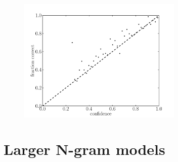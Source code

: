\documentclass[11pt]{article}
\newcommand{\figlabel}[1]{\label{fig:#1}}
\begin{document}
\begin{figure}[htbp]
\begin{center}
    \includegraphics[width=0.7\textwidth]{unigram_confidence_scale.pdf}
\end{center}
\caption{%
\figlabel{unigram-confidence-scale}}
\end{figure}

\section{Larger N-gram models}
\end{document}
